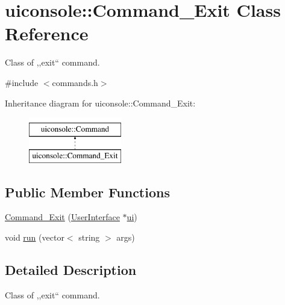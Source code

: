 \hypertarget{classuiconsole_1_1Command__Exit}{
\section{uiconsole::Command\_\-Exit Class Reference}
\label{d5/dd7/classuiconsole_1_1Command__Exit}
}


Class of ,,exit`` command.  




{\ttfamily \#include $<$commands.h$>$}

Inheritance diagram for uiconsole::Command\_\-Exit:\begin{figure}[H]
\begin{center}
\leavevmode
\includegraphics[height=2.000000cm]{d5/dd7/classuiconsole_1_1Command__Exit}
\end{center}
\end{figure}
\subsection*{Public Member Functions}
\begin{DoxyCompactItemize}
\item 
\hyperlink{classuiconsole_1_1Command__Exit_a27f68e3484510c7451417e2babb6b514}{Command\_\-Exit} (\hyperlink{classUserInterface}{UserInterface} $\ast$\hyperlink{classuiconsole_1_1Command_ab43ed5152860c099f858d62f9f556699}{ui})
\item 
void \hyperlink{classuiconsole_1_1Command__Exit_a83d9528d878c0f3cc8aa26a7c3ebc3c3}{run} (vector$<$ string $>$ args)
\end{DoxyCompactItemize}


\subsection{Detailed Description}
Class of ,,exit`` command. 

